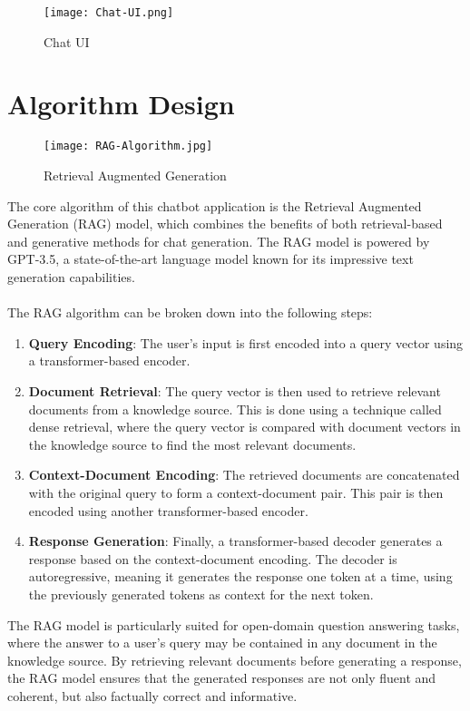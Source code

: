 \begin{figure}[h]
  \centering
  \texttt{[image: Chat-UI.png]}
  \caption{Chat UI}\label{fig:chat-ui}
\end{figure}
\section{Algorithm Design}
\begin{figure}
  \centering
  \texttt{[image: RAG-Algorithm.jpg]}
  \caption{Retrieval Augmented Generation\cite{source-ref}}\label{fig:rag-algo}
\end{figure}
The core algorithm of this chatbot application is the Retrieval Augmented Generation (RAG) model, which combines the benefits of both retrieval-based and generative methods for chat generation. The RAG model is powered by GPT-3.5, a state-of-the-art language model known for its impressive text generation capabilities.
\\\\The RAG algorithm can be broken down into the following steps:
\begin{enumerate}
  \item \textbf{Query Encoding}: The user's input is first encoded into a query vector using a transformer-based encoder.
  \item \textbf{Document Retrieval}: The query vector is then used to retrieve relevant documents from a knowledge source. This is done using a technique called dense retrieval, where the query vector is compared with document vectors in the knowledge source to find the most relevant documents.
  \item \textbf{Context-Document Encoding}: The retrieved documents are concatenated with the original query to form a context-document pair. This pair is then encoded using another transformer-based encoder.
  \item \textbf{Response Generation}: Finally, a transformer-based decoder generates a response based on the context-document encoding. The decoder is autoregressive, meaning it generates the response one token at a time, using the previously generated tokens as context for the next token.
\end{enumerate}

The RAG model is particularly suited for open-domain question answering tasks, where the answer to a user’s query may be contained in any document in the knowledge source. By retrieving relevant documents before generating a response, the RAG model ensures that the generated responses are not only fluent and coherent, but also factually correct and informative.
